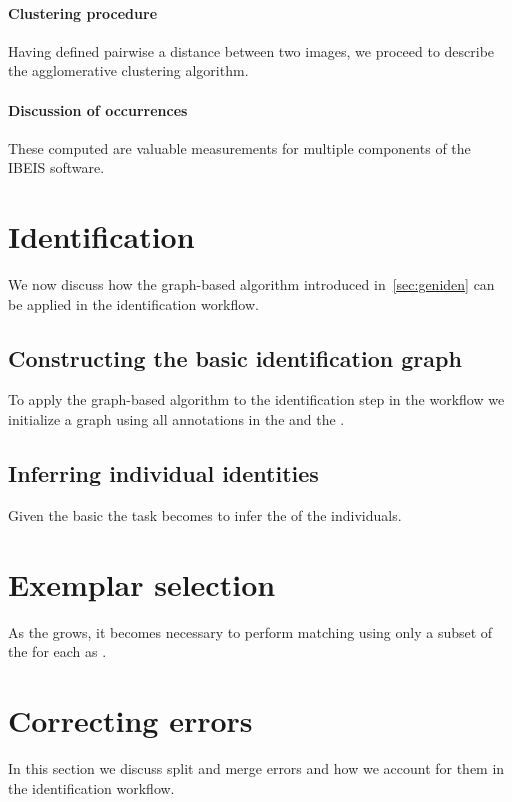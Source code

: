     \paragraph{Clustering procedure}
    Having defined pairwise a distance between two images, we proceed to describe the agglomerative clustering
      algorithm.
    
    \paragraph{Discussion of occurrences}
    These computed \occurrences{} are valuable measurements for multiple components of the IBEIS software.
    
\section{Identification}
    We now discuss how the graph-based algorithm introduced in~\cref{sec:geniden} can be applied in the identification
      workflow.
    
    \subsection{Constructing the basic identification graph}
        To apply the graph-based algorithm to the identification step in the workflow we initialize a graph using all
          annotations in the \occurrence{} and the \exemplars{}.
        
    \subsection{Inferring individual identities}
        Given the basic \idengraph{} the task becomes to infer the \names{} of the individuals.
        
\section{Exemplar selection}
    As the \masterdatabase{} grows, it becomes necessary to perform matching using only a subset of the \annots{} for
      each \name{} as \exemplars{}.
    
\section{Correcting errors}
    In this section we discuss split and merge errors and how we account for them in the identification workflow.
    
